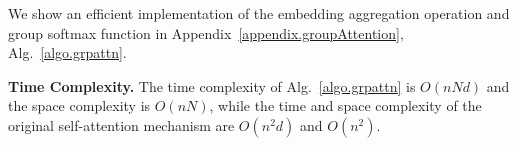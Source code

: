\begin{sloppypar}
We show an efficient implementation of the embedding aggregation operation and group softmax function in Appendix~\ref{appendix.groupAttention}, Alg.~\ref{algo.grpattn}.

\noindent\textbf{Time Complexity.}
The time complexity of Alg.~\ref{algo.grpattn} is $O(nNd)$ and the space complexity is $O(nN)$, while the time and space complexity of the original self-attention mechanism are $O(n^2d)$ and $O(n^2)$.

 

\end{sloppypar}
